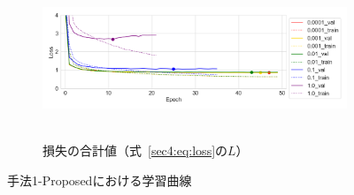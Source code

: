 \documentclass[12pt]{jarticle}
\numberwithin{equation}{section}    %
\numberwithin{figure}{section}      %
\numberwithin{table}{section}      %
\begin{document}
\begin{figure}[bt]
\begin{subfigure}{\linewidth}
        \label{sec4:fig:learning_curve_method_1_proposed_val_ssl_conv_feature_loss}
    \end{subfigure}
    \begin{subfigure}{\linewidth}
        \centering
        \includegraphics[height=48mm]{./figure/sec4/learning_curves/1/total_loss.png}
        \caption{損失の合計値（式~\eqref{sec4:eq:loss}の$L$）}
        \label{sec4:fig:learning_curve_method_1_proposed_val_total_loss}
    \end{subfigure}
    \caption{手法1-Proposedにおける学習曲線}
    \label{sec4:fig:learning_curve_method_1_proposed_val_losses}
\end{figure}
\end{document}
